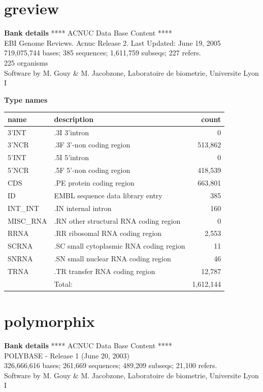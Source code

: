 \documentclass{article}
\begin{document}
\begin{Schunk}
\section{ greview }
\textbf{Bank details}
             ****     ACNUC Data Base Content      ****                         \\
        EBI Genome Reviews. Acnuc Release 2. Last Updated: June 19, 2005\\
719,075,744 bases; 385 sequences; 1,611,759 subseqs; 227 refers.\\
225 organisms\\
Software by M. Gouy \& M. Jacobzone, Laboratoire de biometrie, Universite Lyon I 

\textbf{Type names}
\noindent\begin{tabular}{llr}
\hline \hline
name & description & count \\
\hline
3'INT  &  .3I 3'intron  &  0 \\
3'NCR  &  .3F  3'-non coding region  &  513,862 \\
5'INT  &  .5I 5'intron  &  0 \\
5'NCR  &  .5F  5'-non coding region  &  418,539 \\
CDS  &  .PE protein coding region  &  663,801 \\
ID  &  EMBL sequence data library entry  &  385 \\
INT\_INT  &  .IN  internal intron  &  160 \\
MISC\_RNA  &  .RN other structural RNA coding region  &  0 \\
RRNA  &  .RR ribosomal RNA coding region  &  2,553 \\
SCRNA  &  .SC small cytoplasmic RNA coding region  &  11 \\
SNRNA  &  .SN small nuclear RNA coding region  &  46 \\
TRNA  &  .TR transfer RNA coding region  &  12,787 \\
\hline
 & Total: & 1,612,144 \\
\hline \hline
\end{tabular}

\section{ polymorphix }
\textbf{Bank details}
             ****     ACNUC Data Base Content      ****                         \\
                 POLYBASE - Release 1  (June 20, 2003)\\
326,666,616 bases; 261,669 sequences; 489,209 subseqs; 21,100 refers.\\
Software by M. Gouy \& M. Jacobzone, Laboratoire de biometrie, Universite Lyon I 


\end{Schunk}
\end{document}
